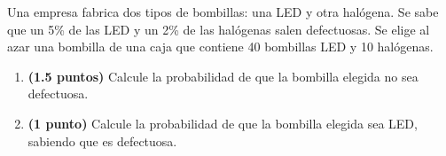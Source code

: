 
Una empresa fabrica dos tipos de bombillas: una LED y otra halógena. Se sabe
que un 5\% de las LED y un 2\% de las halógenas salen defectuosas. Se elige al
azar una bombilla de una caja que contiene 40 bombillas LED y 10 halógenas.
\begin{enumerate}[label=\alph*)]
  \item \textbf{(1.5 puntos)} Calcule la probabilidad de que la bombilla
  elegida no sea defectuosa.
  \item \textbf{(1 punto)} Calcule la probabilidad de que la bombilla elegida
  sea LED, sabiendo que es defectuosa.
\end{enumerate}
